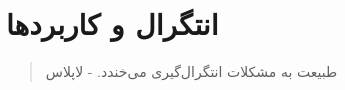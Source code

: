 \chapter{انتگرال و کاربردها}
\thispagestyle{empty}

\begin{quote}
	{\lotus
		طبیعت به مشکلات انتگرال‌گیری می‌خندد. \quad - لاپلاس%
	}
\end{quote}
